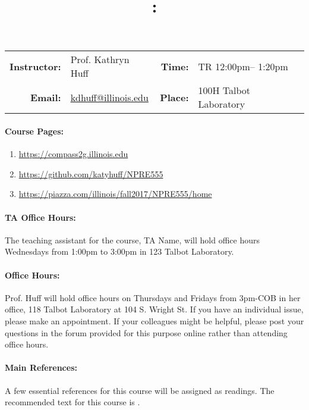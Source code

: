 \documentclass[11pt, a4paper]{article}
\title{\CourseNumber: \CourseTitle\\}
\author{\CourseUniversity}
\date{\CourseSemester \CourseYear}
\makeatletter
\newcommand{\CourseNumber}{NPRE555}
\newcommand{\CourseDays}{TR\xspace}%
\newcommand{\CourseStart}{12:00pm\xspace}%
\newcommand{\CourseEnd}{1:20pm\xspace}%
\newcommand{\CourseInstructor}{Prof. Kathryn Huff}
\newcommand{\CourseInstructorEmail}{kdhuff@illinois.edu}
\newcommand{\CourseRoom}{100H\xspace}%
\newcommand{\CourseBuilding}{Talbot Laboratory\xspace}%
\newcommand{\TeachingAssistant}{TA Name\xspace}%
\newcommand{\TAOfficeHourDays}{Wednesdays\xspace}%
\newcommand{\TAOfficeHourStart}{1:00pm\xspace}%
\newcommand{\TAOfficeHourEnd}{3:00pm\xspace}%
\newcommand{\TAOfficeHourPlace}{123 Talbot Laboratory\xspace}
\makeatother
\begin{document}
\maketitle
\renewcommand{\arraystretch}{2}
\begin{center}
\begin{table}[h]
\begin{tabularx}{\textwidth}{rXrX}
\hline
\textbf{Instructor:} & \CourseInstructor & \textbf{Time:} & \CourseDays \CourseStart -- \CourseEnd \\
\textbf{Email:} &  \href{mailto:\CourseInstructorEmail}{\CourseInstructorEmail} & \textbf{Place:} & \CourseRoom \CourseBuilding\\
\hline
\end{tabularx}

\end{table}
\end{center}

\paragraph{Course Pages:}
\begin{enumerate}
        \item \url{https://compass2g.illinois.edu}
        \item \url{https://github.com/katyhuff/\CourseNumber}
        \item \url{https://piazza.com/illinois/fall2017/\CourseNumber/home}
\end{enumerate}

\paragraph{TA Office Hours:} The teaching assistant for the course,
\TeachingAssistant, will hold office hours \TAOfficeHourDays from
\TAOfficeHourStart to \TAOfficeHourEnd in \TAOfficeHourPlace.

\paragraph{Office Hours:} Prof. Huff will hold office hours on Thursdays and
Fridays from 3pm-COB in her office, 118 Talbot Laboratory at 104 S. Wright St.
If you have an individual issue, please make an appointment. If your colleagues
might be helpful, please post your questions in the forum provided for this
purpose online rather than attending office hours.

\paragraph{Main References:}
A few essential references for this course will be assigned as readings. The
recommended text for this course is \cite{bellandglassstone,stacey}.

\renewcommand{\refname}{\normalfont\selectfont\normalsize}\vspace{-1cm}

\end{document}
